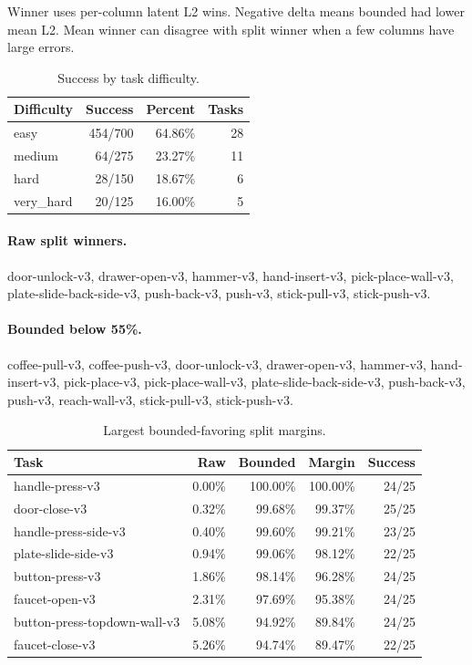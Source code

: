 Winner uses per-column latent L2 wins. Negative delta means bounded had lower mean L2. Mean winner can disagree with split winner when a few columns have large errors.


\begin{table}[ht]
\centering
\caption{Success by task difficulty.}
\label{tab:phase57-max150-difficulty}
\begin{tabular}{@{}l r r r@{}}
\toprule
Difficulty & Success & Percent & Tasks \\
\midrule
easy & 454/700 & 64.86\% & 28 \\
medium & 64/275 & 23.27\% & 11 \\
hard & 28/150 & 18.67\% & 6 \\
very\_hard & 20/125 & 16.00\% & 5 \\
\bottomrule
\end{tabular}
\end{table}


\paragraph{Raw split winners.} door-unlock-v3, drawer-open-v3, hammer-v3, hand-insert-v3, pick-place-wall-v3, plate-slide-back-side-v3, push-back-v3, push-v3, stick-pull-v3, stick-push-v3.


\paragraph{Bounded below 55\%.} coffee-pull-v3, coffee-push-v3, door-unlock-v3, drawer-open-v3, hammer-v3, hand-insert-v3, pick-place-v3, pick-place-wall-v3, plate-slide-back-side-v3, push-back-v3, push-v3, reach-wall-v3, stick-pull-v3, stick-push-v3.


\begin{table}[ht]
\centering
\caption{Largest bounded-favoring split margins.}
\label{tab:phase57-max150-bounded-margins}
\begin{tabular}{@{}lrrrr@{}}
\toprule
Task & Raw & Bounded & Margin & Success \\
\midrule
handle-press-v3 & 0.00\% & 100.00\% & 100.00\% & 24/25 \\
door-close-v3 & 0.32\% & 99.68\% & 99.37\% & 25/25 \\
handle-press-side-v3 & 0.40\% & 99.60\% & 99.21\% & 23/25 \\
plate-slide-side-v3 & 0.94\% & 99.06\% & 98.12\% & 22/25 \\
button-press-v3 & 1.86\% & 98.14\% & 96.28\% & 24/25 \\
faucet-open-v3 & 2.31\% & 97.69\% & 95.38\% & 24/25 \\
button-press-topdown-wall-v3 & 5.08\% & 94.92\% & 89.84\% & 24/25 \\
faucet-close-v3 & 5.26\% & 94.74\% & 89.47\% & 22/25 \\
\bottomrule
\end{tabular}
\end{table}


